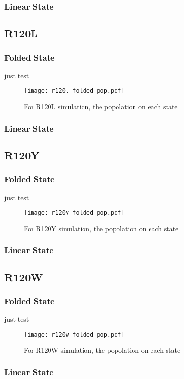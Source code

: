 \documentclass{article}
\begin{document}
\subsubsection{Linear State}

\subsection{R120L}
\subsubsection{Folded State}
just test
\begin{figure}[h]
    \texttt{[image: r120l\_folded\_pop.pdf]}
    \caption{For R120L simulation, the popolation on each state}
    \label{r120lpop}
\end{figure}
\subsubsection{Linear State}

\subsection{R120Y}
\subsubsection{Folded State}
just test
\begin{figure}[h]
    \texttt{[image: r120y\_folded\_pop.pdf]}
    \caption{For R120Y simulation, the popolation on each state}
    \label{r120ypop}
\end{figure}
\subsubsection{Linear State}

\subsection{R120W}
\subsubsection{Folded State}
just test
\begin{figure}[h]
    \texttt{[image: r120w\_folded\_pop.pdf]}
    \caption{For R120W simulation, the popolation on each state}
    \label{r120wpop}
\end{figure}
\subsubsection{Linear State}
\end{document}
